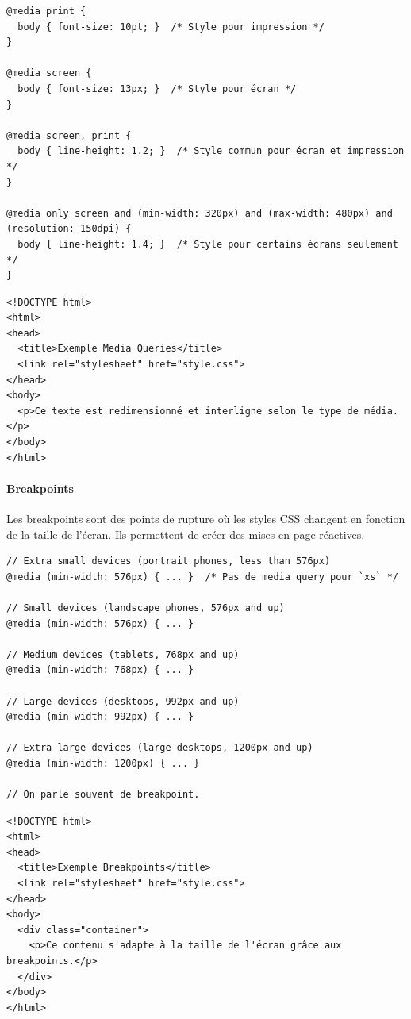 \documentclass{report}
\begin{document}
\begin{multicols*}{2}
\begin{lstlisting}[style=CSSDraculaLight]
@media print {
  body { font-size: 10pt; }  /* Style pour impression */
}

@media screen {
  body { font-size: 13px; }  /* Style pour écran */
}

@media screen, print {
  body { line-height: 1.2; }  /* Style commun pour écran et impression */
}

@media only screen and (min-width: 320px) and (max-width: 480px) and (resolution: 150dpi) {
  body { line-height: 1.4; }  /* Style pour certains écrans seulement */
}
\end{lstlisting}

\begin{lstlisting}[style=HTMLDraculaDark]
<!DOCTYPE html>
<html>
<head>
  <title>Exemple Media Queries</title>
  <link rel="stylesheet" href="style.css">
</head>
<body>
  <p>Ce texte est redimensionné et interligne selon le type de média.</p>
</body>
</html>
\end{lstlisting}

\paragraph{Breakpoints}
Les breakpoints sont des points de rupture où les styles CSS changent en fonction de la taille de l'écran. Ils permettent de créer des mises en page réactives.

\begin{lstlisting}[style=CSSDraculaLight]
// Extra small devices (portrait phones, less than 576px)
@media (min-width: 576px) { ... }  /* Pas de media query pour `xs` */

// Small devices (landscape phones, 576px and up)
@media (min-width: 576px) { ... }  

// Medium devices (tablets, 768px and up)
@media (min-width: 768px) { ... }  

// Large devices (desktops, 992px and up)
@media (min-width: 992px) { ... }  

// Extra large devices (large desktops, 1200px and up)
@media (min-width: 1200px) { ... }  

// On parle souvent de breakpoint.
\end{lstlisting}

\begin{lstlisting}[style=HTMLDraculaDark]
<!DOCTYPE html>
<html>
<head>
  <title>Exemple Breakpoints</title>
  <link rel="stylesheet" href="style.css">
</head>
<body>
  <div class="container">
    <p>Ce contenu s'adapte à la taille de l'écran grâce aux breakpoints.</p>
  </div>
</body>
</html>
\end{lstlisting}







\end{multicols*}
\end{document}
